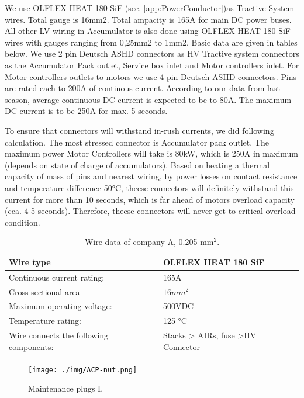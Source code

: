 We use OLFLEX HEAT 180 SiF (see. \ref{app:PowerConductor})as Tractive System wires. Total gauge is 16mm2. Total ampacity is 165A for main DC power buses. All other LV wiring in Accumulator is also done using OLFLEX HEAT 180 SiF wires with gauges ranging from 0,25mm2 to 1mm2. Basic data are given in tables below. We use 2 pin Deutsch ASHD connectors as HV Tractive system connectors as the Accumulator Pack outlet, Service box inlet and Motor controllers inlet. For Motor controllers outlets to motors we use 4 pin Deutsch ASHD connectors. Pins are rated each to 200A of continous current. According to our data from last season, average continuous DC current is expected to be to 80A. The maximum DC current is to be 250A for max. 5 seconds.

To ensure that connectors will withstand in-rush currents, we did following calculation. The most stressed connector is Accumulator pack outlet. The maximum power Motor Controllers will take is 80kW, which is 250A in maximum (depends on state of charge of accumulators). Based on heating a thermal capacity of mass of pins and nearest wiring, by power losses on contact resistance and temperature difference 50°C, theese connectors will definitely withstand this current for more than 10 seconds, which is far ahead of motors overload capacity (cca. 4-5 seconds). Therefore, theese connectors will never get to critical overload condition.


\begin{table}[htbp]
	\centering
	\caption{Wire data of company A, 0.205 mm$^2$.}
	\begin{tabularx}{\textwidth}{|X|X|}\hline
		Wire type & OLFLEX HEAT 180 SiF \\[\TableSize]\hline
		Continuous current rating: & 165A \\[\TableSize]\hline
		Cross-sectional area & $16mm^2$ \\[\TableSize]\hline
		Maximum operating voltage: &  500VDC\\[\TableSize]\hline
		Temperature rating: &  125 °C\\[\TableSize]\hline
		Wire connects the following components: & Stacks > AIRs, fuse >HV Connector \\[\TableSize]\hline
	\end{tabularx}%
	\label{tab:acc-wire}%
\end{table}%

\begin{figure}[H]
	\centering
	\texttt{[image: ./img/ACP-nut.png]}
	\caption{Maintenance plugs I.}
	\label{fig:acp-maintance-plug}
\end{figure}

